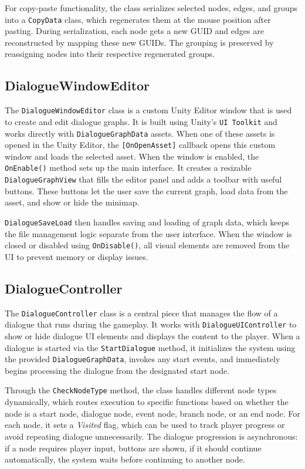 For copy-paste functionality, the class serializes selected nodes, edges, and groups into a \verb|CopyData| class, which regenerates them at the mouse position after pasting. During serialization, each node gets a new GUID and edges are reconstructed by mapping these new GUIDs. The grouping is preserved by reassigning nodes into their respective regenerated groups.

 
\subsection{DialogueWindowEditor}
\label{devlog:DialogueWindowEditor}
The \verb|DialogueWindowEditor| class is a custom Unity Editor window that is used to create and edit dialogue graphs. It is built using Unity’s \verb|UI Toolkit| and works directly with \verb|DialogueGraphData| assets. When one of these assets is opened in the Unity Editor, the \verb|[OnOpenAsset]| callback opens this custom window and loads the selected asset. When the window is enabled, the \verb|OnEnable()| method sets up the main interface. It creates a resizable \verb|DialogueGraphView| that fills the editor panel and adds a toolbar with useful buttons. These buttons let the user save the current graph, load data from the asset, and show or hide the minimap.

\verb|DialogueSaveLoad| then handles saving and loading of graph data, which keeps the file management logic separate from the user interface. When the window is closed or disabled using \verb|OnDisable()|, all visual elements are removed from the UI to prevent memory or display issues.


\subsection{DialogueController}
\label{devlog:DialogueController}
The \verb|DialogueController| class is a central piece that manages the flow of a dialogue that runs during the gameplay. It works with \verb|DialogueUIController| to show or hide dialogue UI elements and displays the content to the player. When a dialogue is started via the \verb|StartDialogue| method, it initializes the system using the provided \verb|DialogueGraphData|, invokes any start events, and immediately begins processing the dialogue from the designated start node.

Through the \verb|CheckNodeType| method, the class handles different node types dynamically, which routes execution to specific functions based on whether the node is a start node, dialogue node, event node, branch node, or an end node. For each node, it sets a \textit{Visited} flag, which can be used to track player progress or avoid repeating dialogue unnecessarily. The dialogue progression is asynchronous: if a node requires player input, buttons are shown, if it should continue automatically, the system waits before continuing to another node.

